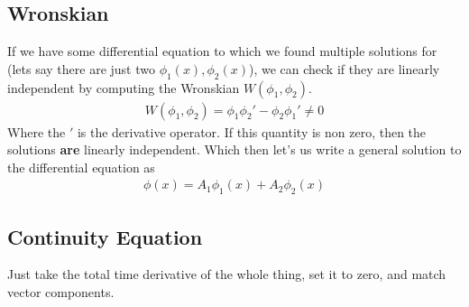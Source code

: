 \subsection{Wronskian}
If we have some differential equation to which we found multiple solutions for (lets say there are just two $\phi_1(x), \phi_2(x)$), we can check if they are linearly independent by computing the Wronskian $W(\phi_1,\phi_2)$. 
\begin{align}
W(\phi_1,\phi_2) = \phi_1\phi_2'-\phi_2\phi_1' \neq 0
\end{align}
Where the $'$ is the derivative operator. If this quantity is non zero, then the solutions \textbf{are} linearly independent. Which then let's us write a general solution to the differential equation as
\begin{align}
\phi(x) = A_1\phi_1(x) + A_2\phi_2(x)
\end{align}

\subsection{Continuity Equation}
Just take the total time derivative of the whole thing, set it to zero, and match vector components.


